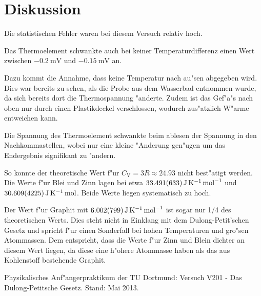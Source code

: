 \section{Diskussion}
\label{diskussion}

Die statistischen Fehler waren bei diesem Versuch relativ hoch. 

Das Thermoelement schwankte auch bei keiner Temperaturdifferenz einen Wert zwischen $\SI{-0.2}{\milli\volt}$ und $\SI{-0.15}{\milli\volt}$ an.

Dazu kommt die Annahme, dass keine Temperatur nach au"sen abgegeben wird. Dies war bereits zu sehen, als die Probe aus dem Wasserbad entnommen wurde, da sich bereits dort die Thermospannung "anderte.
Zudem ist das Gef"a"s nach oben nur durch einen Plastikdeckel verschlossen, wodurch zus"atzlich W"arme entweichen kann.

Die Spannung des Thermoelement schwankte beim ablesen der Spannung in den Nachkommastellen, wobei nur eine kleine "Anderung gen"ugen um das Endergebnis signifikant zu "andern.

So konnte der theoretische Wert f"ur $C_\mathrm{V} = 3R \approx 24.93$ nicht best"atigt werden. Die Werte f"ur Blei und Zinn lagen bei etwa $\SI{33.491 (633)}{\joule\per\kelvin\per\mol}$ und $\SI{30.609 (4225)}{\joule\per\kelvin\mol}$. Beide Werte liegen systematisch zu hoch.

Der Wert f"ur Graphit mit $\SI{6.002 (799)}{\joule\per\kelvin\per\mol}$ ist sogar nur 1/4 des theoretischen Werts. Dies steht nicht in Einklang mit dem Dulong-Petit'schen Gesetz und spricht f"ur einen Sonderfall bei hohen Temperaturen und gro"sen Atommassen. Dem entspricht, dass die Werte f"ur Zinn und Blein dichter an diesem Wert liegen, da diese eine h"ohere Atommasse haben als das aus Kohlenstoff bestehende Graphit.


\begin{thebibliography}{9}
	 Physikalisches Anf"angerpraktikum der TU Dortmund: Versuch V201 - Das Dulong-Petitsche Gesetz. Stand: Mai 2013.
\end{thebibliography}
